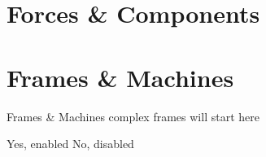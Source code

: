 \documentclass[9pt,xcolor={svgnames, x11names}]{beamer}
\begin{document}
\section{Forces \& Components}


\section{Frames \& Machines}

\begin{frame}{Frames \& Machines}
  complex frames will start here

  \ifnum{}
 Yes, enabled
\else
 No, disabled
\fi
\end{frame}
\end{document}
